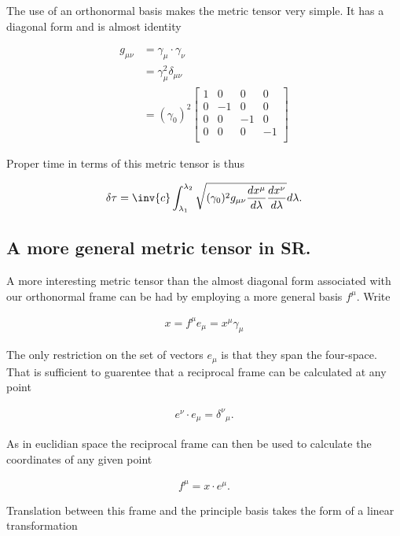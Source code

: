 \documentclass{article}      %
\begin{document}
The use of an orthonormal basis makes the metric tensor very simple.  It has a diagonal form and is almost identity

\begin{align*}
g_{\mu\nu} &= \gamma_{\mu} \cdot \gamma_{\nu} \\
&= \gamma_{\mu}^2 \delta_{\mu\nu} \\
&= (\gamma_0)^2 
\begin{bmatrix}
1 & 0 & 0 & 0 \\
0 & -1 & 0 & 0 \\
0 & 0 & -1 & 0 \\
0 & 0 & 0 & -1 \\
\end{bmatrix}
\end{align*}

Proper time in terms of this metric tensor is thus

\begin{equation}
\delta \tau = \inv{c} \int_{\lambda_1}^{\lambda_2} \sqrt{ (\gamma_{0})^2 g_{\mu\nu} \frac{dx^{\mu}}{d\lambda} \frac{dx^{\nu}}{d\lambda} } d\lambda.
\end{equation}

\subsection{ A more general metric tensor in SR. }

A more interesting metric tensor than the almost diagonal form associated with our orthonormal frame can be had by 
employing a more general basis ${f^{\mu}}$.  Write

\begin{align*}
x = f^{\mu} e_\mu = x^{\mu} \gamma_\mu
\end{align*}

The only restriction on the set of vectors ${e_\mu}$ is that they span the four-space.  That is sufficient to guarentee that a 
reciprocal frame can be calculated at any point

\begin{align*}
e^\nu \cdot e_\mu = {\delta^\nu}_\mu.
\end{align*}

As in euclidian space the reciprocal frame can then be used to calculate the coordinates of any given point

\begin{align*}
f^{\mu} = x \cdot e^\mu.
\end{align*}

Translation between this frame and the principle basis takes the form of a linear transformation
\end{document}
